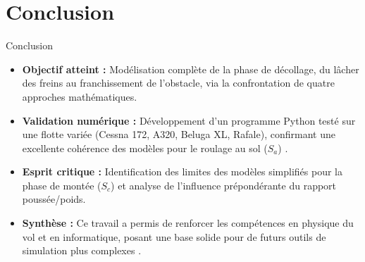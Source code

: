 	
	
	
	\section{Conclusion}
	
	\begin{frame}{Conclusion}
		\begin{itemize}
			\item \textbf{Objectif atteint :} Modélisation complète de la phase de décollage, du lâcher des freins au franchissement de l'obstacle, via la confrontation de quatre approches mathématiques.
			\item \textbf{Validation numérique :} Développement d'un programme Python testé sur une flotte variée (Cessna 172, A320, Beluga XL, Rafale), confirmant une excellente cohérence des modèles pour le roulage au sol ($S_a$) .
			\item \textbf{Esprit critique :} Identification des limites des modèles simplifiés pour la phase de montée ($S_c$) et analyse de l'influence prépondérante du rapport poussée/poids.
			\item \textbf{Synthèse :} Ce travail a permis de renforcer les compétences en physique du vol et en informatique, posant une base solide pour de futurs outils de simulation plus complexes .
		\end{itemize}
		
	\end{frame}

